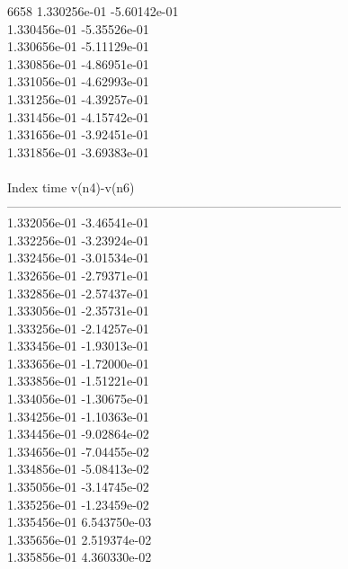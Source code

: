 6658	1.330256e-01	-5.60142e-01	\\ 	1.330456e-01	-5.35526e-01	\\ 	1.330656e-01	-5.11129e-01	\\ 	1.330856e-01	-4.86951e-01	\\ 	1.331056e-01	-4.62993e-01	\\ 	1.331256e-01	-4.39257e-01	\\ 	1.331456e-01	-4.15742e-01	\\ 	1.331656e-01	-3.92451e-01	\\ 	1.331856e-01	-3.69383e-01	\\ \hline
\\ \hline
Index   time            v(n4)-v(n6)     \\ \hline
--------------------------------------------------------------------------------\\ 	1.332056e-01	-3.46541e-01	\\ 	1.332256e-01	-3.23924e-01	\\ 	1.332456e-01	-3.01534e-01	\\ 	1.332656e-01	-2.79371e-01	\\ 	1.332856e-01	-2.57437e-01	\\ 	1.333056e-01	-2.35731e-01	\\ 	1.333256e-01	-2.14257e-01	\\ 	1.333456e-01	-1.93013e-01	\\ 	1.333656e-01	-1.72000e-01	\\ 	1.333856e-01	-1.51221e-01	\\ 	1.334056e-01	-1.30675e-01	\\ 	1.334256e-01	-1.10363e-01	\\ 	1.334456e-01	-9.02864e-02	\\ 	1.334656e-01	-7.04455e-02	\\ 	1.334856e-01	-5.08413e-02	\\ 	1.335056e-01	-3.14745e-02	\\ 	1.335256e-01	-1.23459e-02	\\ 	1.335456e-01	6.543750e-03	\\ 	1.335656e-01	2.519374e-02	\\ 	1.335856e-01	4.360330e-02	\\ \hline
